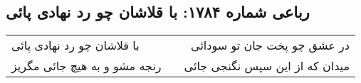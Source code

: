 \begin{center}
\section*{رباعی شماره ۱۷۸۴: با قلاشان چو رد نهادی پائی}
\label{sec:1784}
\begin{longtable}{l p{0.5cm} r}
با قلاشان چو رد نهادی پائی
&&
در عشق چو پخت جان تو سودائی
\\
رنجه مشو و به هیچ جائی مگریز
&&
میدان که از این سپس نگنجی جائی
\\
\end{longtable}
\end{center}
